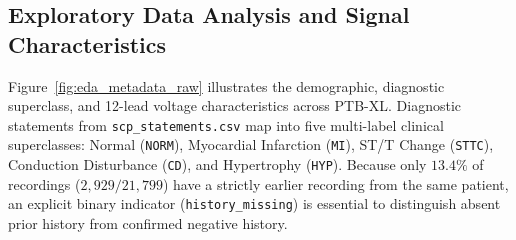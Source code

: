\documentclass[11pt,a4paper]{article}
\begin{document}
\begin{table}[H]
\centering
\caption{Summary of patient-isolated PTB-XL cohort protocols and generated cache fingerprints.}
\label{tab:cohorts}
\small
{}
\end{table}

\subsection{Exploratory Data Analysis and Signal Characteristics}
Figure~\ref{fig:eda_metadata_raw} illustrates the demographic, diagnostic superclass, and 12-lead voltage characteristics across PTB-XL. Diagnostic statements from \texttt{scp\_statements.csv} map into five multi-label clinical superclasses: Normal (\texttt{NORM}), Myocardial Infarction (\texttt{MI}), ST/T Change (\texttt{STTC}), Conduction Disturbance (\texttt{CD}), and Hypertrophy (\texttt{HYP}). Because only $13.4\%$ of recordings ($2{,}929 / 21{,}799$) have a strictly earlier recording from the same patient, an explicit binary indicator (\texttt{history\_missing}) is essential to distinguish absent prior history from confirmed negative history.
\end{document}
